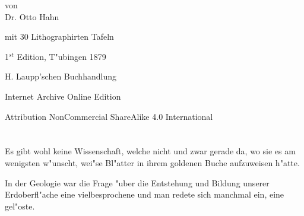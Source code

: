 \documentclass[a4paper, 11pt, oneside, german]{article}
\begin{document}
\begin{titlepage}
	
	{\Large von\\ \LARGE Dr. Otto Hahn\\} %
	
	\vspace*{1\baselineskip} %
	
    {\small mit 30 Lithographirten Tafeln} %
    

	
		
	\vspace*{\fill}%
	
	1$^{st}$ Edition, T"ubingen 1879 %
	
	{\small H. Laupp'schen Buchhandlung } %

	\vspace{1\baselineskip} %

    Internet Archive Online Edition  %
	
	{\small Attribution NonCommercial ShareAlike 4.0 International } %
\end{titlepage}
\setlength{\parskip}{1mm plus1mm minus1mm}
\setcounter{tocdepth}{2}
\setcounter{secnumdepth}{3}
\pagestyle{fancy}
\fancyhf{}
\cfoot{\swabfamily{\thepage}}
\tableofcontents
\clearpage
\listoffigures
\clearpage
\LARGE
\section*{}
\paragraph{}
Es gibt wohl keine Wissenschaft, welche nicht und zwar gerade da, wo sie es am wenigsten w"unscht, wei"se Bl"atter in ihrem goldenen Buche aufzuweisen h"atte.

In der Geologie war die Frage "uber die Entstehung und Bildung unserer Erdoberfl"ache eine vielbesprochene und man redete sich manchmal ein, eine gel"oste.
\end{document}
